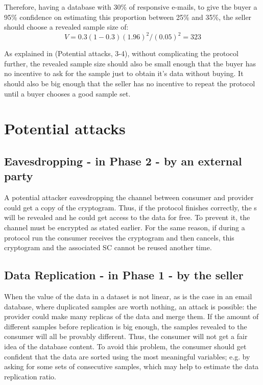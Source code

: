 \documentclass[]{article}
\begin{document}
	Therefore, having a database with 30\% of responsive e-mails, to give the buyer a 95\% confidence on estimating this proportion between 25\% and 35\%, the seller should choose a revealed sample size of: 
	\begin{equation}
	V = 0.3(1-0.3)(1.96)^2/(0.05)^2 = 323
	\end{equation}  
	
	As explained in (Potential attacks, 3-4), without complicating the protocol further, the revealed sample size should also be small enough that the buyer has no incentive to ask for the sample just to obtain it's data without buying. It should also be big enough that the seller has no incentive to repeat the protocol until a buyer chooses a good sample set.
	
	
	
	\section{Potential attacks}
	\subsection{Eavesdropping - in Phase 2 - by an external party}
	A potential attacker eavesdropping the channel between consumer and provider could get a copy of the cryptogram. Thus, if the protocol finishes correctly, the s will be revealed and he could get access to the data for free. To prevent it, the channel must be encrypted as stated earlier. For the same reason, if during a protocol run the consumer receives the cryptogram and then cancels, this cryptogram and the associated SC cannot be reused another time.
	
	\subsection{Data Replication - in Phase 1 - by the seller} When the value of the data in a dataset is not linear, as is the case in an email database, where duplicated samples are worth nothing, an attack is possible: the provider could make many replicas of the data and merge them. If the amount of different samples before replication is big enough, the samples revealed to the consumer will all be provably different. Thus, the consumer will not get a fair idea of the database content. To avoid this problem, the consumer should get confident that the data are sorted using the most meaningful variables; e.g. by asking for some sets of consecutive samples, which may help to estimate the data replication ratio.
	
\end{document}
